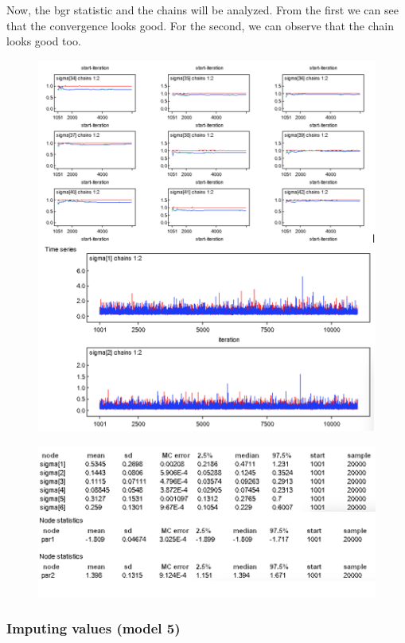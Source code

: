 \documentclass{article}
\begin{document}
\newpage
Now, the bgr statistic and the chains will be analyzed. From the first we can see that the convergence looks good. For the second, we can observe that the chain looks good too.

\begin{figure}[ht!]
\centering
\includegraphics[width=14cm]{figures/model4_sigma2.png}
\end{figure}


\begin{figure}[ht!]
\centering
\includegraphics[width=12cm]{figures/model4_ultima.png}
\end{figure}

\newpage
\subsubsection*{Imputing values (model 5)}
\end{document}
